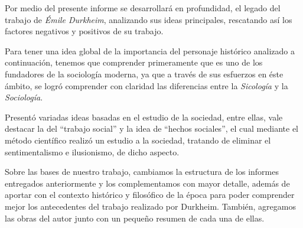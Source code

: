 \vspace{1cm}
Por medio del presente informe se desarrollará en profundidad,
el legado del trabajo de \emph{Émile Durkheim}, analizando sus
ideas principales, rescatando así los factores negativos y positivos
de su trabajo.
\vspace{1cm}

Para tener una idea global de la importancia del personaje histórico
analizado a continuación, tenemos que comprender primeramente que es
uno de los fundadores de la sociología moderna, ya que a través de sus
esfuerzos en éste ámbito, se logró comprender con claridad las diferencias
entre la \emph{Sicología} y la \emph{Sociología}.
\vspace{1cm}

Present\'o variadas ideas basadas en el estudio de la sociedad,
entre ellas, vale destacar la del ``trabajo social'' y la idea de ``hechos sociales'', el cual mediante el método científico realizó un estudio a la sociedad, tratando de eliminar el sentimentalismo e ilusionismo, de dicho aspecto.
\vspace{1cm}

Sobre las bases de nuestro trabajo, cambiamos la estructura de los informes entregados anteriormente y los complementamos con mayor detalle,
 adem\'as de aportar con el contexto hist\'orico y filos\'ofico de la \'epoca para poder comprender mejor los antecedentes del trabajo realizado por Durkheim.
 Tambi\'en, agregamos las obras del autor junto con un peque\~no resumen de cada una de ellas.

\newpage
